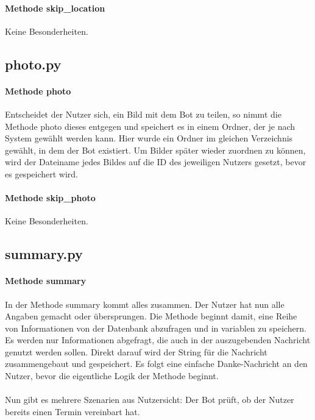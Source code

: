             \paragraph{Methode skip\_location}
                Keine Besonderheiten.
        

        \subsection{photo.py}
            \paragraph{Methode photo}
                Entscheidet der Nutzer sich, ein Bild mit dem Bot zu teilen, so nimmt die Methode photo dieses entgegen und speichert es in einem Ordner, der je nach System gewählt werden kann. Hier wurde ein Ordner im gleichen Verzeichnis gewählt, in dem der Bot existiert. Um Bilder später wieder zuordnen zu können, wird der Dateiname jedes Bildes auf die ID des jeweiligen Nutzers gesetzt, bevor es gespeichert wird.

            \paragraph{Methode skip\_photo}
                Keine Besonderheiten.
        

        \subsection{summary.py}
            \paragraph{Methode summary}
                In der Methode summary kommt alles zusammen. Der Nutzer hat nun alle Angaben gemacht oder übersprungen. Die Methode beginnt damit, eine Reihe von Informationen von der Datenbank abzufragen und in variablen zu speichern. Es werden nur Informationen abgefragt, die auch in der auszugebenden Nachricht genutzt werden sollen. Direkt darauf wird der String für die Nachricht zusammengebaut und gespeichert. Es folgt eine einfache Danke-Nachricht an den Nutzer, bevor die eigentliche Logik der Methode beginnt.\\
                \\
                Nun gibt es mehrere Szenarien aus Nutzersicht: Der Bot prüft, ob der Nutzer bereits einen Termin vereinbart hat.
                
